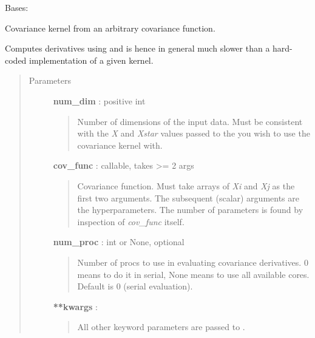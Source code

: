 \documentclass[letterpaper,10pt,english]{sphinxmanual}
\begin{document}
\begin{fulllineitems}
\label{gptools.kernel:gptools.kernel.core.ArbitraryKernel}
Bases: {\hyperref[gptools.kernel:gptools.kernel.core.Kernel]{}}

Covariance kernel from an arbitrary covariance function.

Computes derivatives using  and is hence in general
much slower than a hard-coded implementation of a given kernel.
\begin{quote}\begin{description}
\item[{Parameters }] \leavevmode
\textbf{num\_dim} : positive int
\begin{quote}

Number of dimensions of the input data. Must be consistent with the \emph{X}
and \emph{Xstar} values passed to the
{\hyperref[gptools:gptools.gaussian_process.GaussianProcess]{}} you wish to use
the covariance kernel with.
\end{quote}

\textbf{cov\_func} : callable, takes \textgreater{}= 2 args
\begin{quote}

Covariance function. Must take arrays of \emph{Xi} and \emph{Xj} as the
first two arguments. The subsequent (scalar) arguments are the
hyperparameters. The number of parameters is found by inspection of
\emph{cov\_func} itself.
\end{quote}

\textbf{num\_proc} : int or None, optional
\begin{quote}

Number of procs to use in evaluating covariance derivatives. 0 means
to do it in serial, None means to use all available cores. Default is
0 (serial evaluation).
\end{quote}

\textbf{**kwargs} :
\begin{quote}

All other keyword parameters are passed to {\hyperref[gptools.kernel:gptools.kernel.core.Kernel]{}}.
\end{quote}

\end{description}\end{quote}

\end{fulllineitems}
\end{document}
